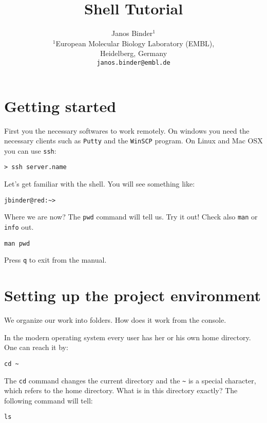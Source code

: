 \documentclass{article}\usepackage[]{graphicx}\usepackage[usenames,dvipsnames]{color}
\title{Shell Tutorial}
\author{Janos Binder$^1$ \\[1em]$^1$European Molecular Biology Laboratory (EMBL),\\ Heidelberg, Germany\\
\texttt{janos.binder@embl.de}}
\begin{document}
\maketitle


\tableofcontents

\section{Getting started} \label{sec:prep}

First you the necessary softwares to work remotely. On windows you need the necessary clients such as \verb+Putty+ and the \verb+WinSCP+ program. On Linux and Mac OSX you can use \verb+ssh+:

\begin{verbatim}
> ssh server.name
\end{verbatim}

Let's get familiar with the shell. You will see something like:

\begin{verbatim}
jbinder@red:~> 
\end{verbatim}

Where we are now? The \verb+pwd+ command will tell us. Try it out! Check also \verb+man+ or \verb+info+ out.

\begin{verbatim}
man pwd
\end{verbatim}

Press \verb+q+ to exit from the manual.

\section{Setting up the project environment}

We organize our work into folders. How does it work from the console. 

In the modern operating system every user has her or his own home directory. One can reach it by:

\begin{verbatim}
cd ~
\end{verbatim}

The \verb+cd+ command changes the current directory and the \verb+~+ is a special character, which refers to the home directory. What is in this directory exactly? The following command will tell:

\begin{verbatim}
ls
\end{verbatim}
\end{document}
